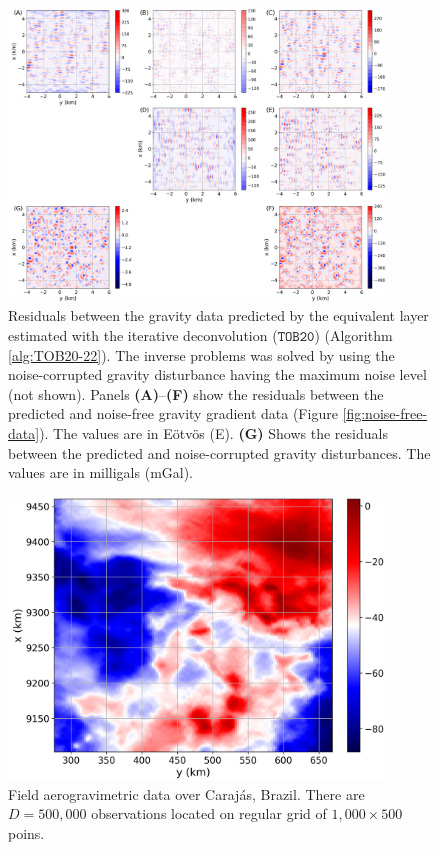 \begin{figure}[htbp]
	\begin{center}
		\includegraphics[width=10cm]{Fig/TOB20_residuals}
	\end{center}
	\caption{
		Residuals between the gravity data predicted by the equivalent layer estimated with the 
		iterative deconvolution ($\mathtt{TOB20}$) (Algorithm \ref{alg:TOB20-22}).
		The inverse problems was solved by using the noise-corrupted gravity 
		disturbance having the maximum noise level (not shown).
		Panels \textbf{(A)}--\textbf{(F)} show the residuals between the predicted and noise-free
		gravity gradient data (Figure \ref{fig:noise-free-data}). The values are in Eötvös (E).
		\textbf{(G)} Shows the residuals between the predicted and noise-corrupted gravity disturbances.
		The values are in milligals (mGal).
		}
	\label{fig:residuals-TOB20}
\end{figure}

\begin{figure}[htbp]
	\begin{center}
		\includegraphics[width=10cm]{Fig/carajas_data}
	\end{center}
	\caption{
		Field aerogravimetric data over Caraj{\'a}s, Brazil. 
		There are $D = 500, 000$ observations located on regular grid of $1,000 \times 500$ poins.
		}
	\label{fig:carajas-data}
\end{figure}

